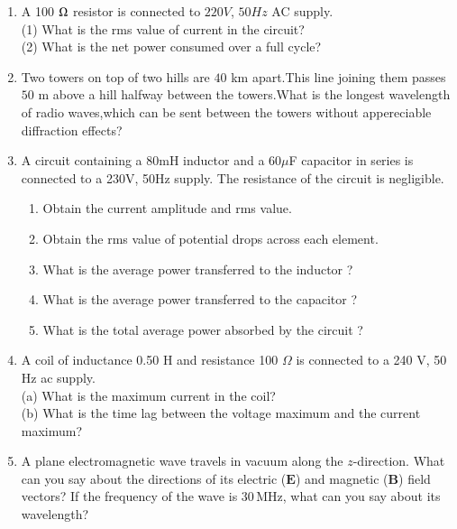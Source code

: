 \begin{enumerate}[label=\thesection.\arabic*,ref=\thesection.\theenumi]
\item A 100 $\ohm$ resistor is connected to $220 V$, $50 Hz$ AC supply.\\
(1) What is the rms value of current in the circuit?\\
(2) What is the net power consumed over a full cycle?\\
\solution

\pagebreak

\item  Two towers on top of two hills are $40$ km apart.This line joining them passes $50$ m above a hill halfway between the towers.What is the longest wavelength of radio waves,which can be sent between the towers without  appereciable diffraction effects?\\
\solution
\pagebreak
\item A circuit containing a 80mH inductor and a 60$\mu$F capacitor in series is connected to a 230V, 50Hz supply. The resistance of the circuit is negligible.\\
\begin{enumerate}
  \item Obtain the current amplitude and rms value.
  \item Obtain the rms value of potential drops across each element.
  \item What is the average power transferred to the inductor ?
  \item What is the average power transferred to the capacitor ?
  \item What is the total average power absorbed by the circuit ? 
\end{enumerate}
\solution
\pagebreak
\item A coil of inductance 0.50 H and resistance 100 $\Omega$ is connected to a 240 V, 50 Hz ac supply.\\
(a) What is the maximum current in the coil?\\		
(b) What is the time lag between the voltage maximum and the current maximum?\\
\solution
\pagebreak

\item A plane electromagnetic wave travels in vacuum along the \(z\)-direction. What can you say about the directions of its electric (\(\mathbf{E}\)) and magnetic (\(\mathbf{B}\)) field vectors? If the frequency of the wave is \(30 \, \text{MHz}\), what can you say about its wavelength?\\
\solution
\pagebreak


\end{enumerate}
